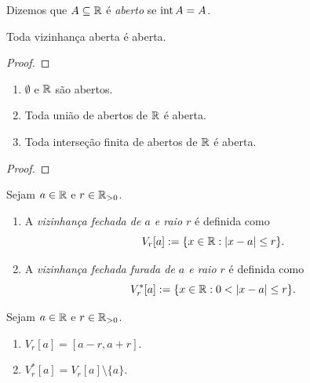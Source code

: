 \begin{definition}
    Dizemos que $A \subseteq \mathbb{R}$ é \emph{aberto} se $\operatorname{int}{A} = A$.
\end{definition}

\begin{proposition}
    Toda vizinhança aberta é aberta.
\end{proposition}

\begin{proof}
    \blackproof
\end{proof}

\begin{theorem}
    \leavevmode
        \begin{enumerate}[leftmargin=*, align=left, label=\textbf{(\alph*)}]
            \item $\emptyset$ e $\mathbb{R}$ são abertos.
            \item Toda união de abertos de $\mathbb{R}$ é aberta.
            \item Toda interseção finita de abertos de $\mathbb{R}$ é aberta.
        \end{enumerate}
\end{theorem}

\begin{proof}
\end{proof}

\begin{definition}
    Sejam $a \in \mathbb{R}$ e $r \in \mathbb{R}_{>0}$.
        \begin{enumerate}[leftmargin=*, align=left, label=\textbf{(\alph*)}]
            \item A \emph{vizinhança fechada de $a$ e raio $r$} é definida como
                \[
                    V_r[a] := \{x \in \mathbb{R} : |x-a| \leq r \}.
                \]
            \item A \emph{vizinhança fechada furada de $a$ e raio $r$} é definida como
                \[
                    V^*_r[a] := \{x \in \R : 0<|x-a| \leq r \}.
                \]
        \end{enumerate}
\end{definition}

\begin{corollary}
    Sejam $a \in \mathbb{R}$ e $r \in \mathbb{R}_{>0}$.
        \begin{enumerate}[leftmargin=*, align=left, label=\textbf{(\alph*)}]
            \item $V_r[a] = \left[a-r, a+r \right]$.
            \item $V^*_r[a] = V_r[a] \setminus \{a\}$.
        \end{enumerate}
\end{corollary}

